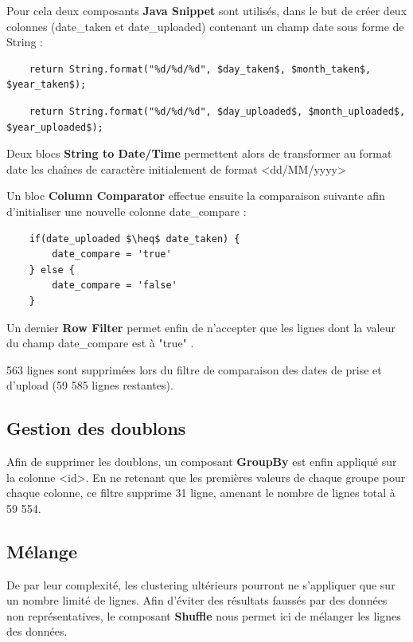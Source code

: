 Pour cela deux composants \textbf{Java Snippet} sont utilisés, dans le but de créer deux colonnes (date\_taken et date\_uploaded) contenant un champ date sous forme de String :

\begin{lstlisting}
    return String.format("%d/%d/%d", $day_taken$, $month_taken$, $year_taken$);
\end{lstlisting}

\begin{lstlisting}
    return String.format("%d/%d/%d", $day_uploaded$, $month_uploaded$, $year_uploaded$);
\end{lstlisting}

Deux blocs \textbf{String to Date/Time} permettent alors de transformer au format date les chaînes de caractère initialement de format <dd/MM/yyyy>

Un bloc \textbf{Column Comparator} effectue ensuite la comparaison suivante afin d'initialiser une nouvelle colonne date\_compare :
\begin{lstlisting}
    if(date_uploaded $\heq$ date_taken) {
        date_compare = 'true'
    } else {
        date_compare = 'false'
    }
\end{lstlisting}

Un dernier \textbf{Row Filter} permet enfin de n'accepter que les lignes dont la valeur du champ date\_compare est à "true" .

563 lignes sont supprimées lors du filtre de comparaison des dates de prise et d'upload (59 585 lignes restantes).\\

\subsection{Gestion des doublons}
Afin de supprimer les doublons, un composant \textbf{GroupBy} est enfin appliqué sur la colonne <id>. En ne retenant que les premières valeurs de chaque groupe pour chaque colonne, ce filtre supprime 31 ligne, amenant le nombre de lignes total à 59 554.

\subsection{Mélange}
De par leur complexité, les clustering ultérieurs pourront ne s'appliquer que sur un nombre limité de lignes. Afin d'éviter des résultats faussés par des données non représentatives, le composant \textbf{Shuffle} nous permet ici de mélanger les lignes des données.

